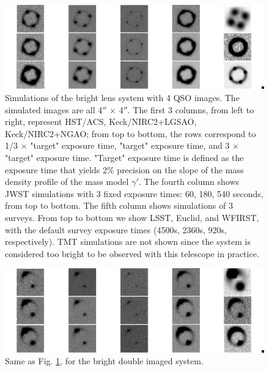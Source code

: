 \documentclass[a4paper,11pt]{article}
\begin{document}
\begin{figure}
\begin{center}
\includegraphics[width=1.0\textwidth]{figures/brighter_system_4QSOimages_all.png}
\end{center}
\caption{Simulations of the bright lens system with 4 QSO images. The simulated images are all 4$''$ $\times$ 4$''$. The first 3 columns, from left to right, represent HST/ACS, Keck/NIRC2+LGSAO, Keck/NIRC2+NGAO; from top to bottom, the rows correspond to 1/3 $\times$ "target" exposure time, "target" exposure time, and 3 $\times$ "target" exposure time. "Target" exposure time is defined as the exposure time that yields 2\% precision on the slope of the mass density profile of the mass model $\gamma'$. The fourth column shows JWST simulations with 3 fixed exposure times: 60, 180, 540 seconds, from top to bottom. The fifth column
shows simulations of 3 surveys. From top to bottom we show LSST, Euclid, and WFIRST, with the default survey exposure times (4500s, 2360s, 920s, respectively). TMT simulations are not shown since the system is considered too bright to be observed with this telescope in practice.}
\label{fig:brighter_4QSOimages_montage}
\end{figure}


\begin{figure}
\begin{center}
\includegraphics[width=1.0\textwidth]{figures/brighter_system_2QSOimages_all.png}
\end{center}
\caption{Same as Fig. \ref{fig:brighter_4QSOimages_montage}, for the bright double imaged system.}
\label{fig:brighter_2QSOimages_montage}
\end{figure}
\end{document}
